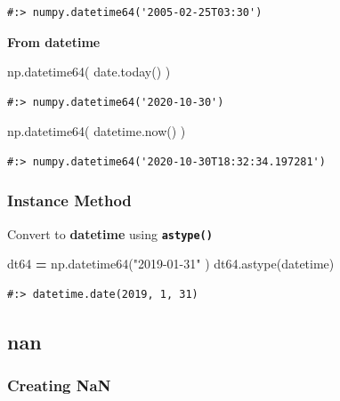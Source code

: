 \documentclass[
]{book}
\newenvironment{Shaded}{\begin{snugshade}}{\end{snugshade}}
\newcommand{\NormalTok}[1]{#1}
\newcommand{\OperatorTok}[1]{\textcolor[rgb]{0.43,0.43,0.43}{\textbf{#1}}}
\newcommand{\StringTok}[1]{\textcolor[rgb]{0.5,0.5,0.5}{#1}}
\begin{document}
\begin{verbatim}
#:> numpy.datetime64('2005-02-25T03:30')
\end{verbatim}

\textbf{From datetime}

\begin{Shaded}
\begin{Highlighting}[]
\NormalTok{np.datetime64( date.today() )}
\end{Highlighting}
\end{Shaded}

\begin{verbatim}
#:> numpy.datetime64('2020-10-30')
\end{verbatim}

\begin{Shaded}
\begin{Highlighting}[]
\NormalTok{np.datetime64( datetime.now() )}
\end{Highlighting}
\end{Shaded}

\begin{verbatim}
#:> numpy.datetime64('2020-10-30T18:32:34.197281')
\end{verbatim}

\hypertarget{instance-method-2}{%
\subsubsection{Instance Method}\label{instance-method-2}}

Convert to \textbf{datetime} using \textbf{\texttt{astype()}}

\begin{Shaded}
\begin{Highlighting}[]
\NormalTok{dt64 }\OperatorTok{=}\NormalTok{ np.datetime64(}\StringTok{"2019-01-31"}\NormalTok{ )}
\NormalTok{dt64.astype(datetime)}
\end{Highlighting}
\end{Shaded}

\begin{verbatim}
#:> datetime.date(2019, 1, 31)
\end{verbatim}

\hypertarget{nan}{%
\subsection{nan}\label{nan}}

\hypertarget{creating-nan}{%
\subsubsection{Creating NaN}\label{creating-nan}}
\end{document}
